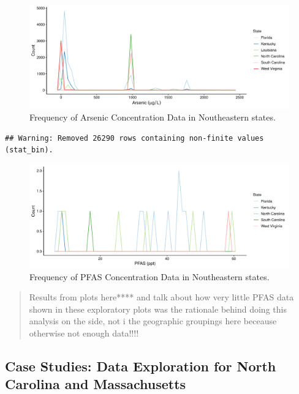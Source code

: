 \documentclass[12pt,]{article}
\begin{document}
\begin{figure}
\centering
\includegraphics{Project_Template_files/figure-latex/figs3-1.pdf}
\caption{Frequency of Arsenic Concentration Data in Noutheastern
states.}
\end{figure}

\begin{verbatim}
## Warning: Removed 26290 rows containing non-finite values (stat_bin).
\end{verbatim}

\begin{figure}
\centering
\includegraphics{Project_Template_files/figure-latex/figs4-1.pdf}
\caption{Frequency of PFAS Concentration Data in Noutheastern states.}
\end{figure}

\begin{quote}
Results from plots here**** and talk about how very little PFAS data
shown in these exploratory plots was the rationale behind doing this
analysis on the side, not i the geographic groupings here beceause
otherwise not enough data!!!!
\end{quote}

\newpage

\hypertarget{case-studies-data-exploration-for-north-carolina-and-massachusetts}{%
\subsection{Case Studies: Data Exploration for North Carolina and
Massachusetts}\label{case-studies-data-exploration-for-north-carolina-and-massachusetts}}
\end{document}
